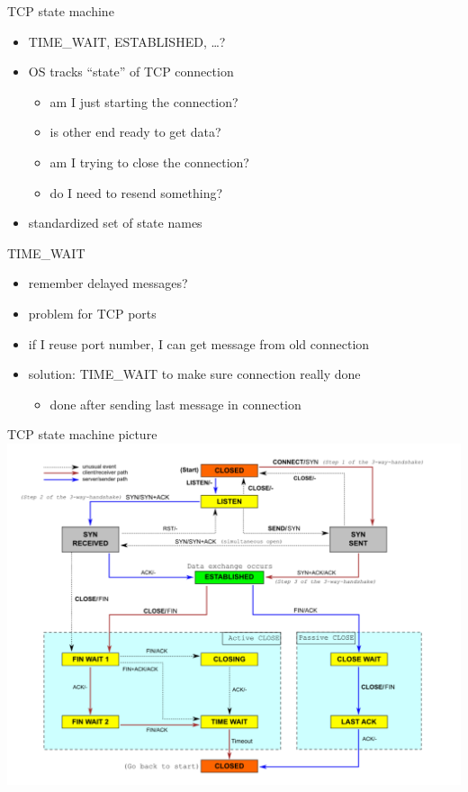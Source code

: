 \begin{frame}{TCP state machine}
\begin{itemize}
\item TIME\_WAIT, ESTABLISHED, \ldots?
\vspace{.5cm}
\item OS tracks ``state'' of TCP connection
    \begin{itemize}
    \item am I just starting the connection?
    \item is other end ready to get data?
    \item am I trying to close the connection?
    \item do I need to resend something?
    \end{itemize}
\item standardized set of state names
\end{itemize}
\end{frame}


\begin{frame}{TIME\_WAIT}
\begin{itemize}
\item remember delayed messages?
\vspace{.5cm}
\item problem for TCP ports
\item if I reuse port number, I can get message from old connection
\item solution: TIME\_WAIT to make sure connection really done
    \begin{itemize}
    \item done after sending last message in connection
    \end{itemize}
\end{itemize}
\end{frame}

\begin{frame}{TCP state machine picture}
\includegraphics[height=0.9\textheight]{../network/TcpState}
\end{frame}
